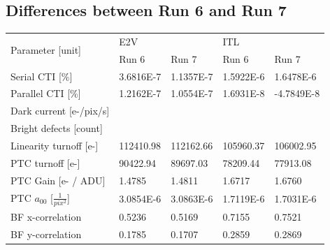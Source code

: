 \subsection{Differences between Run 6 and Run 7}\label{differences-from-previous-runs}


\begin{table}[H]
\begin{tabular}{|l|ll|ll|}
\hline
\multirow{2}{*}{Parameter [unit]}          & \multicolumn{2}{l|}{E2V}                   & \multicolumn{2}{l|}{ITL}                    \\ \cline{2-5} 
                                    & \multicolumn{1}{l|}{Run 6}     & Run 7     & \multicolumn{1}{l|}{Run 6}     & Run 7      \\ \hline
Serial CTI {[}\%{]}                 & \multicolumn{1}{l|}{3.6816E-7} & 1.1357E-7 & \multicolumn{1}{l|}{1.5922E-6} & 1.6478E-6  \\ \hline
Parallel CTI {[}\%{]}               & \multicolumn{1}{l|}{1.2162E-7} & 1.0554E-7 & \multicolumn{1}{l|}{1.6931E-8} & -4.7849E-8 \\ \hline
Dark current {[}e-/pix/s{]}         & \multicolumn{1}{l|}{}          &           & \multicolumn{1}{l|}{}          &            \\ \hline
Bright defects {[}count{]}          & \multicolumn{1}{l|}{}          &           & \multicolumn{1}{l|}{}          &            \\ \hline
Linearity turnoff {[}e-{]}          & \multicolumn{1}{l|}{112410.98} & 112162.66 & \multicolumn{1}{l|}{105960.37} & 106002.95  \\ \hline
PTC turnoff {[}e-{]}                & \multicolumn{1}{l|}{90422.94}  & 89697.03  & \multicolumn{1}{l|}{78209.44}  & 77913.08   \\ \hline
PTC Gain {[}e- / ADU{]}             & \multicolumn{1}{l|}{1.4785}    & 1.4811    & \multicolumn{1}{l|}{1.6717}    & 1.6760     \\ \hline
PTC $a_{00}$ [$\frac{1}{pix^2}$]      & \multicolumn{1}{l|}{3.0854E-6} & 3.0863E-6 & \multicolumn{1}{l|}{1.7119E-6} & 1.7031E-6  \\ \hline
BF x-correlation                    & \multicolumn{1}{l|}{0.5236}    & 0.5169    & \multicolumn{1}{l|}{0.7155}    & 0.7521     \\ \hline
BF y-correlation                    & \multicolumn{1}{l|}{0.1785}    & 0.1707    & \multicolumn{1}{l|}{0.2859}    & 0.2869     \\ \hline

\end{tabular}
\end{table}
